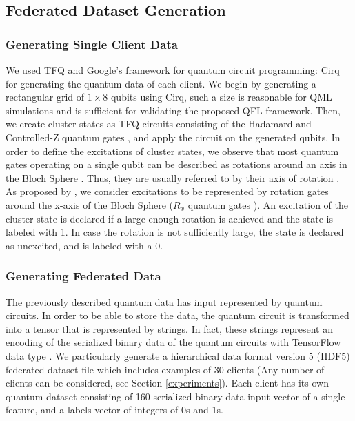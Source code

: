 \documentclass{article}
\begin{document}
\subsection{Federated Dataset Generation}
\subsubsection{Generating Single Client Data}
We used TFQ and Google's framework for quantum circuit programming: Cirq \cite{cirq} for generating the quantum data of each client. We begin by generating a rectangular grid of $1\times8$ qubits using Cirq, such a size is reasonable for QML simulations and is sufficient for validating the proposed QFL framework. Then, we create cluster states as TFQ circuits consisting of the Hadamard and Controlled-Z quantum gates \cite{nielsen_book}, and apply the circuit on the generated qubits. In order to define the excitations of cluster states, we observe that most quantum gates operating on a single qubit can be described as rotations around an axis in the Bloch Sphere \cite{lu2005bloch1,glendinning2005bloch2}. Thus, they are usually referred to by their axis of rotation \cite{cirq}. As proposed by \cite{TFQ_qcnn}, we consider excitations to be represented by rotation gates around the x-axis of the Bloch Sphere ($R_x$ quantum gates \cite{nielsen_book}). An excitation of the cluster state is declared if a large enough rotation is achieved and the state is labeled with 1. In case the rotation is not sufficiently large, the state is declared as unexcited, and is labeled with a 0.
\subsubsection{Generating Federated Data}
The previously described quantum data has input represented by quantum circuits. In order to be able to store the data, the quantum circuit is transformed into a tensor that is represented by strings. In fact, these strings represent an encoding of the serialized binary data of the quantum circuits with TensorFlow data type . We particularly generate a hierarchical data format version 5 (HDF5) federated dataset file which includes examples of 30 clients (Any number of clients can be considered, see Section \ref{experiments}). Each client has its own quantum dataset consisting of 160 serialized binary data input vector of a single feature, and a labels vector of integers of 0s and 1s. 
\end{document}
